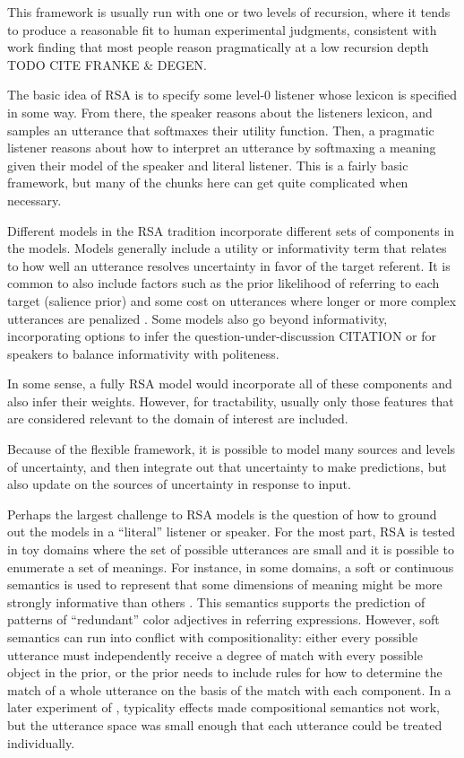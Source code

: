 \documentclass[]{article}
\begin{document}
This framework is usually run with one or two levels of recursion, where it tends to produce a reasonable fit to human experimental judgments, consistent with work finding that most people reason pragmatically at a low recursion depth TODO CITE FRANKE \& DEGEN. 

The basic idea of RSA is to specify some level-0 listener whose lexicon is specified in some way. From there, the speaker reasons about the listeners lexicon, and samples an utterance that softmaxes their utility function. Then, a pragmatic listener reasons about how to interpret an utterance by softmaxing a meaning given their model of the speaker and literal listener. This is a fairly basic framework, but many of the chunks here can get quite complicated when necessary. 

Different models in the RSA tradition incorporate different sets of components in the models. Models generally include a utility or informativity term that relates to how well an utterance resolves uncertainty in favor of the target referent.  It is common to also include factors such as the prior likelihood of referring to each target (salience prior) and some cost on utterances where longer or more complex utterances are penalized \cite{goodman2016}. Some models also go beyond informativity, incorporating options to infer the question-under-discussion CITATION or for speakers to balance informativity with politeness.

In some sense, a fully RSA model would incorporate all of these components and also infer their weights. However, for tractability, usually only those features that are considered relevant to the domain of interest are included.

Because of the flexible framework, it is possible to model many sources and levels of uncertainty, and then integrate out that uncertainty to make predictions, but also update on the sources of uncertainty in response to input. 

Perhaps the largest challenge to RSA models is the question of how to ground out the models in a ``literal'' listener or speaker. For the most part, RSA is tested in toy domains where the set of possible utterances are small and it is possible to enumerate a set of meanings. For instance, in some domains, a soft or continuous semantics is used to represent that some dimensions of meaning might be more strongly informative than others \cite{degen20200406}. This semantics supports the prediction of patterns of ``redundant'' color adjectives in referring expressions. However, soft semantics can run into conflict with compositionality: either every possible utterance must independently receive a degree of match with every possible object in the prior, or the prior needs to include rules for how to determine the match of a whole utterance on the basis of the match with each component. In a later experiment of \cite{degen20200406}, typicality effects made compositional semantics not work, but the utterance space was small enough that each utterance could be treated individually. 
\end{document}
